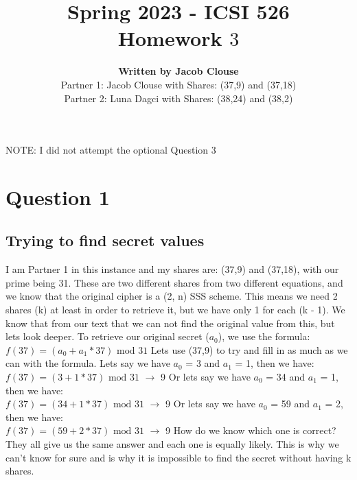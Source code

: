 \documentclass[10pt]{article}
\author{\vspace{0.2in}\textbf{Written by Jacob Clouse}\\  Partner 1: Jacob Clouse with Shares: (37,9) and (37,18)\\ Partner 2: Luna Dagci with Shares: (38,24) and (38,2)}
\title{Spring 2023 - ICSI 526\\Homework $3$}
\begin{document}
\maketitle
\tableofcontents
\vspace{0.2in}
\noindent NOTE: I did not attempt the optional Question 3
\section{Question 1}
\subsection{Trying to find secret values}
\noindent I am Partner 1 in this instance and my shares are: (37,9) and  (37,18), with our prime being 31. These are two different shares from two different equations, and we know that the original cipher is a (2, n) SSS scheme. This means we need 2 shares (k) at least in order to retrieve it, but we have only 1 for each (k - 1). We know that from our text that we can not find the original value from this, but lets look deeper. To retrieve our original secret ($a_0$), we use the formula:\\ 

$f(37) = (a_0 + a_1*37) \textrm{ mod } 31$
\vspace{0.1in}
\newline
Lets use (37,9) to try and fill in as much as we can with the formula. Lets say we have $a_0$ = 3 and $a_1$ = 1, then we have:
\\ 

$f(37) = (3 + 1*37) \textrm{ mod } 31$
$\rightarrow$ 9
\vspace{0.1in}
\newline
Or lets say we have $a_0$ = 34 and $a_1$ = 1, then we have:
\\ 

$f(37) = (34 + 1*37) \textrm{ mod } 31$
$\rightarrow$ 9
\vspace{0.1in}
\newline
Or lets say we have $a_0$ = 59 and $a_1$ = 2, then we have:
\\ 

$f(37) = (59 + 2*37) \textrm{ mod } 31$
$\rightarrow$ 9
\vspace{0.1in}
\newline
How do we know which one is correct? They all give us the same answer and  each one is equally likely. This is why we can't know for sure and is why it is impossible to find the secret without having k shares.
\end{document}
